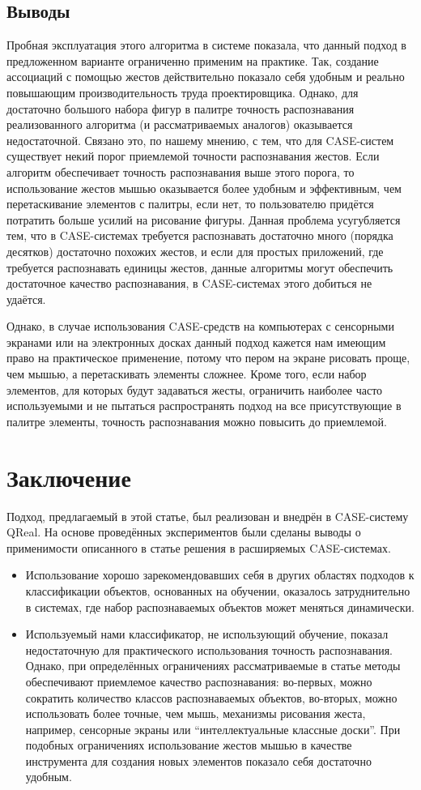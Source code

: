 \documentclass[a5paper]{article}
\begin{document}
\subsection{Выводы}
Пробная эксплуатация этого алгоритма в системе показала, что данный подход в предложенном варианте ограниченно применим на практике. Так, создание ассоциаций с помощью жестов действительно показало себя удобным и реально повышающим производительность труда проектировщика. Однако, для достаточно большого набора фигур в палитре точность распознавания реализованного алгоритма (и рассматриваемых аналогов) оказывается недостаточной. Связано это, по нашему мнению, с тем, что для CASE-систем существует некий порог приемлемой точности распознавания жестов. Если алгоритм обеспечивает точность распознавания выше этого порога, то использование жестов мышью оказывается более удобным и эффективным, чем перетаскивание элементов с палитры, если нет, то пользователю придётся потратить больше усилий на рисование фигуры. Данная проблема усугубляется тем, что в CASE-системах требуется распознавать достаточно много (порядка десятков) достаточно похожих жестов, и если для простых приложений, где требуется распознавать единицы жестов, данные алгоритмы могут обеспечить достаточное качество распознавания, в CASE-системах этого добиться не удаётся.

Однако, в случае использования CASE-средств на компьютерах с сенсорными экранами или на электронных досках данный подход кажется нам имеющим право на практическое применение, потому что пером на экране рисовать проще, чем мышью, а перетаскивать элементы сложнее. Кроме того, если набор элементов, для которых будут задаваться жесты, ограничить наиболее часто используемыми и не пытаться распространять подход на все присутствующие в палитре элементы, точность распознавания можно повысить до приемлемой.

\section{Заключение}
Подход, предлагаемый в этой статье, был реализован и внедрён в CASE-систему QReal. На основе проведённых экспериментов были сделаны выводы о применимости описанного в статье решения в расширяемых CASE-системах.
\begin{itemize}
  \item Использование хорошо зарекомендовавших себя в других областях подходов к классификации объектов, основанных на обучении, оказалось затруднительно в системах, где набор распознаваемых объектов может меняться динамически.
  \item Используемый нами классификатор, не использующий обучение, показал недостаточную для практического использования точность распознавания. Однако, при определённых ограничениях рассматриваемые в статье методы обеспечивают приемлемое качество распознавания: во-первых, можно сократить количество классов  распознаваемых объектов, во-вторых, можно использовать более точные, чем мышь, механизмы рисования жеста, например, сенсорные экраны или ``интеллектуальные классные доски''. При подобных ограничениях использование жестов мышью в качестве инструмента для создания новых элементов показало себя достаточно удобным.
\end{itemize}
\end{document}
